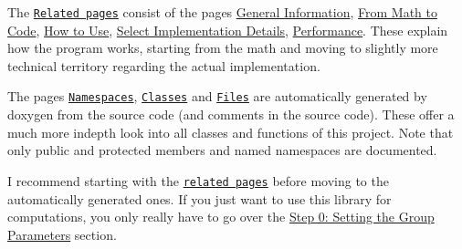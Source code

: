 \begin{DoxyItemize}
\item The \href{namespaces.html}{\tt Related pages} consist of the pages \hyperlink{index}{General Information}, \hyperlink{math}{From Math to Code}, \hyperlink{use}{How to Use}, \hyperlink{algo}{Select Implementation Details}, \hyperlink{perf}{Performance}. These explain how the program works, starting from the math and moving to slightly more technical territory regarding the actual implementation.
\item The pages \href{namespaces.html}{\tt Namespaces}, \href{annotated.html}{\tt Classes} and \href{files.html}{\tt Files} are automatically generated by doxygen from the source code (and comments in the source code). These offer a much more indepth look into all classes and functions of this project. Note that only public and protected members and named namespaces are documented.
\item I recommend starting with the \href{namespaces.html}{\tt related pages} before moving to the automatically generated ones. If you just want to use this library for computations, you only really have to go over the \hyperlink{use_how}{Step 0\+: Setting the Group Parameters} section. 
\end{DoxyItemize}